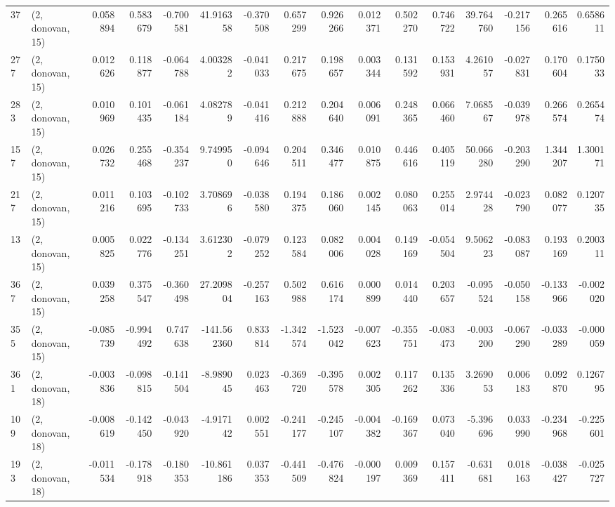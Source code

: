 \begin{tabular}{llrrrrrrrrrrrrrr}
37  &  (2, donovan, 15) &   0.058894 &  0.583679 & -0.700581 &   41.916358 & -0.370508 &   0.657299 &  0.926266 &  0.012371 &  0.502270 &  0.746722 &   39.764760 & -0.217156 &  0.265616 &  0.658611 \\
277 &  (2, donovan, 15) &   0.012626 &  0.118877 & -0.064788 &    4.003282 & -0.041033 &   0.217675 &  0.198657 &  0.003344 &  0.131592 &  0.153931 &    4.261057 & -0.027831 &  0.170604 &  0.175033 \\
283 &  (2, donovan, 15) &   0.010969 &  0.101435 & -0.061184 &    4.082789 & -0.041416 &   0.212888 &  0.204640 &  0.006091 &  0.248365 &  0.066460 &    7.068567 & -0.039978 &  0.266574 &  0.265474 \\
157 &  (2, donovan, 15) &   0.026732 &  0.255468 & -0.354237 &    9.749950 & -0.094646 &   0.204511 &  0.346477 &  0.010875 &  0.446616 &  0.405119 &   50.066280 & -0.203290 &  1.344207 &  1.300171 \\
217 &  (2, donovan, 15) &   0.011216 &  0.103695 & -0.102733 &    3.708696 & -0.038580 &   0.194375 &  0.186060 &  0.002145 &  0.080063 &  0.255014 &    2.974428 & -0.023790 &  0.082077 &  0.120735 \\
13  &  (2, donovan, 15) &   0.005825 &  0.022776 & -0.134251 &    3.612302 & -0.079252 &   0.123584 &  0.082006 &  0.004028 &  0.149169 & -0.054504 &    9.506223 & -0.083087 &  0.193169 &  0.200311 \\
367 &  (2, donovan, 15) &   0.039258 &  0.375547 & -0.360498 &   27.209804 & -0.257163 &   0.502988 &  0.616174 &  0.000899 &  0.014440 &  0.203657 &   -0.095524 & -0.050158 & -0.133966 & -0.002020 \\
355 &  (2, donovan, 15) &  -0.085739 & -0.994492 &  0.747638 & -141.562360 &  0.833814 &  -1.342574 & -1.523042 & -0.007623 & -0.355751 & -0.083473 &   -0.003200 & -0.067290 & -0.033289 & -0.000059 \\
361 &  (2, donovan, 18) &  -0.003836 & -0.098815 & -0.141504 &   -8.989045 &  0.023463 &  -0.369720 & -0.395578 &  0.002305 &  0.117262 &  0.135336 &    3.269053 &  0.006183 &  0.092870 &  0.126795 \\
109 &  (2, donovan, 18) &  -0.008619 & -0.142450 & -0.043920 &   -4.917142 &  0.002551 &  -0.241177 & -0.245107 & -0.004382 & -0.169367 &  0.073040 &   -5.396696 &  0.033990 & -0.234968 & -0.225601 \\
193 &  (2, donovan, 18) &  -0.011534 & -0.178918 & -0.180353 &  -10.861186 &  0.037353 &  -0.441509 & -0.476824 & -0.000197 &  0.009369 &  0.157411 &   -0.631681 &  0.018163 & -0.038427 & -0.025727 \\

\end{tabular}
